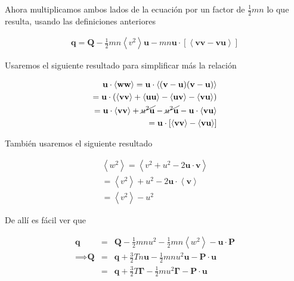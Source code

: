   Ahora multiplicamos ambos lados de la ecuaci\'on por un factor de $\frac{1}{2}mn$ lo que resulta, usando las definiciones anteriores 
  
  \begin{eqnarray*}
    \textbf{q} = \textbf{Q} - \frac{1}{2}mn\left<v^2\right>\textbf{u} - mn\textbf{u}\cdot[\left<\textbf{vv} - \textbf{vu}\right>]
  \end{eqnarray*}


  \begin{shaded}
  
    Usaremos el siguiente resultado para simplificar m\'as la relaci\'on
    
    \begin{eqnarray*}
      \textbf{u}\cdot\left<\textbf{ww}\right> = \textbf{u}\cdot\left<(\textbf{v} - \textbf{u})(\textbf{v} - \textbf{u})\right>\\
      = \textbf{u}\cdot(\left<\textbf{vv}\right> + \left<\textbf{uu}\right> - \left<\textbf{uv}\right> - \left<\textbf{vu}\right>) \\
      = \textbf{u}\cdot\left<\textbf{vv}\right> + \cancel{u^2\textbf{u}} - \cancel{u^2\textbf{u}} - \textbf{u}\cdot\left<\textbf{vu}\right>\\
      = \textbf{u}\cdot[\left<\textbf{vv}\right> - \left<\textbf{vu}\right>]
    \end{eqnarray*}

    Tambi\'en usaremos el siguiente resultado

    \begin{eqnarray*}
      \left<w^2\right> = \left<v^2 + u^2 - 2\textbf{u}\cdot\textbf{v}\right>\\
      = \left<v^2\right> + u^2 - 2\textbf{u}\cdot\left<\textbf{v}\right>\\
      = \left<v^2\right> - u^2
    \end{eqnarray*}
  \end{shaded}

  De all\'i es f\'acil ver que 

  \begin{eqnarray}
    \textbf{q} &=& \textbf{Q} -\frac{1}{2}mnu^2 - \frac{1}{2}mn\left<w^2\right> - \textbf{u}\cdot\textbf{P}\nonumber\\
    \implies \textbf{Q} &=& \textbf{q} + \frac{3}{2}Tn\textbf{u} - \frac{1}{2}mnu^2\textbf{u} - \textbf{P}\cdot\textbf{u}\nonumber \\
                        &=& \textbf{q} + \frac{3}{2}T\pmb{\Gamma} - \frac{1}{2}mu^2\pmb{\Gamma} - \textbf{P}\cdot\textbf{u}
  \end{eqnarray}

